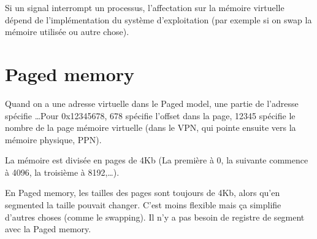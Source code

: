 Si un signal interrompt un processus, l'affectation sur la mémoire
virtuelle dépend de l'implémentation du système d'exploitation (par
exemple si on swap la mémoire utilisée ou autre chose).

\section{Paged memory}

Quand on a une adresse virtuelle dans le Paged model, une partie de
l'adresse spécifie \ldots Pour 0x12345678, 678 spécifie l'offset dans la
page, 12345 spécifie le nombre de la page mémoire virtuelle (dans le VPN, qui
pointe ensuite vers la mémoire physique, PPN). \newline

La mémoire est divisée en pages de 4Kb (La première à 0, la suivante
commence à 4096, la troisième à 8192,\ldots). \newline

En Paged memory, les tailles des pages sont toujours de 4Kb, alors qu'en
segmented la taille pouvait changer. C'est moins flexible mais ça
simplifie d'autres choses (comme le swapping). Il n'y a pas besoin de
registre de segment avec la Paged memory. \newline
